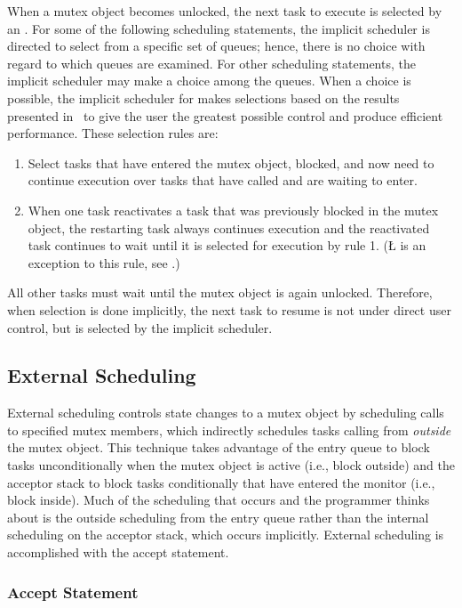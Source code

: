 \documentclass[openright,twoside]{report}
\begin{document}
When a mutex object becomes unlocked, the next task to execute is selected by an .
For some of the following scheduling statements, the implicit scheduler is directed to select from a specific set of queues;
hence, there is no choice with regard to which queues are examined.
For other scheduling statements, the implicit scheduler may make a choice among the queues.
When a choice is possible, the implicit scheduler for \uC makes selections based on the results presented in~\cite{Buhr95b} to give the user the greatest possible control and produce efficient performance.
These selection rules are:
\begin{enumerate}
\item
Select tasks that have entered the mutex object, blocked, and now need to continue execution over tasks that have called and are waiting to enter.
\item
When one task reactivates a task that was previously blocked in the mutex object, the restarting task always continues execution and the reactivated task continues to wait until it is selected for execution by rule 1.
(\LGinlinetrue\LGbegin\lgrinde\L{}\endlgrinde\LGend{} is an exception to this rule, see .)
\end{enumerate}
All other tasks must wait until the mutex object is again unlocked.
Therefore, when selection is done implicitly, the next task to resume is not under direct user control, but is selected by the implicit scheduler.


\subsection{External Scheduling}
\label{s:ExternalScheduling}

External scheduling controls state changes to a mutex object by scheduling calls to specified mutex members, which indirectly schedules tasks calling from \emph{outside} the mutex object.
This technique takes advantage of the entry queue to block tasks unconditionally when the mutex object is active (i.e., block outside) and the acceptor stack to block tasks conditionally that have entered the monitor (i.e., block inside).
Much of the scheduling that occurs and the programmer thinks about is the outside scheduling from the entry queue rather than the internal scheduling on the acceptor stack, which occurs implicitly.
External scheduling is accomplished with the accept statement.


\subsubsection{Accept Statement}
\label{s:AcceptStatement}
\end{document}
